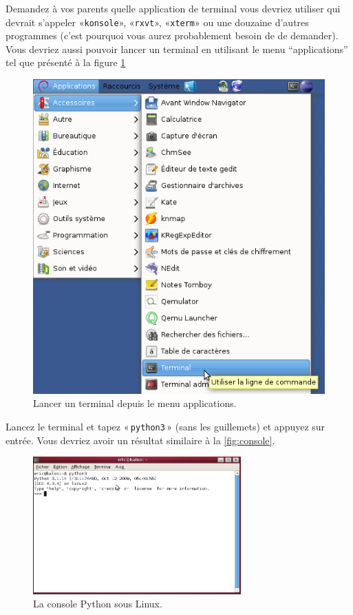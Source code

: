 \begin{LINUX}
Demandez à vos parents quelle application de terminal vous devriez utiliser qui devrait s'appeler «\texttt{konsole}», «\texttt{rxvt}», «\texttt{xterm}» ou une douzaine d'autres programmes (c'est pourquoi vous aurez probablement besoin de de demander). Vous devriez aussi pouvoir lancer un terminal en utilisant le menu ``applications'' tel que présenté à la figure \ref{fig:menu-terminal}
\begin{figure}[!ht]
\capstart
\centering
\includegraphics[scale=0.6]{images/linux-menu-terminal}
\caption{Lancer un terminal depuis le menu applications.}\label{fig:menu-terminal}
\end{figure}

Lancez le terminal et tapez « \texttt{python3} » (sans les guillemets) et appuyez sur entrée. Vous devriez avoir un résultat similaire à la \autoref{fig:console}.
\begin{figure}
\begin{center}
\includegraphics[width=80mm]{images/linux-console-python3}
\end{center}
\caption{La console Python sous Linux.}\label{fig:console}
\end{figure}
\end{LINUX}

